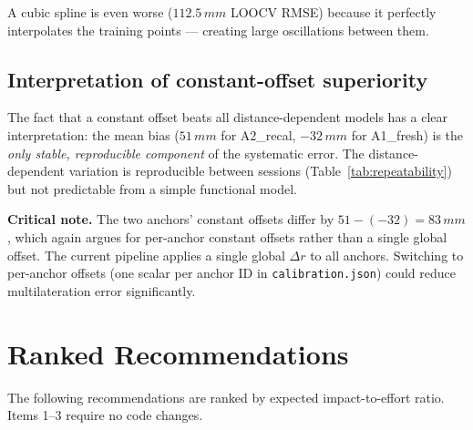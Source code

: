 \documentclass[10pt,a4paper,twocolumn]{article}
\begin{document}
A cubic spline is even worse ($112.5\,mm$ LOOCV RMSE) because it
perfectly interpolates the training points --- creating large oscillations
between them.

\subsection{Interpretation of constant-offset superiority}

The fact that a constant offset beats all distance-dependent models has a
clear interpretation: the mean bias ($51\,mm$ for A2\_recal,
$-32\,mm$ for A1\_fresh) is the \emph{only stable, reproducible
component} of the systematic error.  The distance-dependent variation is
reproducible between sessions (Table~\ref{tab:repeatability}) but not
predictable from a simple functional model.

\textbf{Critical note.}  The two anchors' constant offsets differ by
$51 - (-32) = 83\,mm$, which again argues for per-anchor constant
offsets rather than a single global offset.  The current pipeline applies a
single global $\Delta r$ to all anchors.  Switching to per-anchor offsets
(one scalar per anchor ID in \texttt{calibration.json}) could reduce
multilateration error significantly.

\section{Ranked Recommendations}

The following recommendations are ranked by expected impact-to-effort ratio.
Items 1--3 require no code changes.
\end{document}
